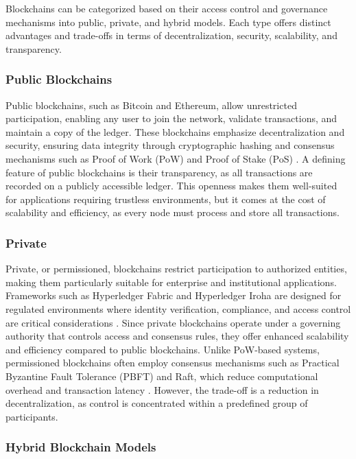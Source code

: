 \documentclass{article}
\begin{document}
Blockchains can be categorized based on their access control and governance mechanisms into public, private, and hybrid models. Each type offers distinct advantages and trade-offs in terms of decentralization, security, scalability, and transparency.

\subsubsection{Public Blockchains}

Public blockchains, such as Bitcoin and Ethereum, allow unrestricted participation, enabling any user to join the network, validate transactions, and maintain a copy of the ledger. These blockchains emphasize decentralization and security, ensuring data integrity through cryptographic hashing and consensus mechanisms such as Proof of Work (PoW) and Proof of Stake (PoS) \cite{nakamoto2008bitcoin}. A defining feature of public blockchains is their transparency, as all transactions are recorded on a publicly accessible ledger. This openness makes them well-suited for applications requiring trustless environments, but it comes at the cost of scalability and efficiency, as every node must process and store all transactions.

\subsubsection{Private}

Private, or permissioned, blockchains restrict participation to authorized entities, making them particularly suitable for enterprise and institutional applications. Frameworks such as Hyperledger Fabric and Hyperledger Iroha are designed for regulated environments where identity verification, compliance, and access control are critical considerations \cite{cachin2016architecture}. Since private blockchains operate under a governing authority that controls access and consensus rules, they offer enhanced scalability and efficiency compared to public blockchains. Unlike PoW-based systems, permissioned blockchains often employ consensus mechanisms such as Practical Byzantine Fault Tolerance (PBFT) and Raft, which reduce computational overhead and transaction latency \cite{vukolic2017}. However, the trade-off is a reduction in decentralization, as control is concentrated within a predefined group of participants.

\subsubsection{Hybrid Blockchain Models}
\end{document}
